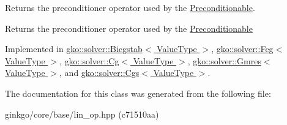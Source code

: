 Returns the preconditioner operator used by the \hyperlink{classgko_1_1Preconditionable}{Preconditionable}. 

\begin{DoxyReturn}{Returns}
the preconditioner operator used by the \hyperlink{classgko_1_1Preconditionable}{Preconditionable} 
\end{DoxyReturn}


Implemented in \hyperlink{classgko_1_1solver_1_1Bicgstab_ac16d32672fbc91d8cfd7c0607c9771db}{gko\+::solver\+::\+Bicgstab$<$ Value\+Type $>$}, \hyperlink{classgko_1_1solver_1_1Fcg_a2dec8d13548e8b316d6598c9ee8b0881}{gko\+::solver\+::\+Fcg$<$ Value\+Type $>$}, \hyperlink{classgko_1_1solver_1_1Cg_a797544ecc8d86d2798014e7f5f5baf4f}{gko\+::solver\+::\+Cg$<$ Value\+Type $>$}, \hyperlink{classgko_1_1solver_1_1Gmres_ac2e3e0024a37647eda9f8a7f5b4cefb4}{gko\+::solver\+::\+Gmres$<$ Value\+Type $>$}, and \hyperlink{classgko_1_1solver_1_1Cgs_ad349dc1381dfdcb7a47223908806dcc7}{gko\+::solver\+::\+Cgs$<$ Value\+Type $>$}.



The documentation for this class was generated from the following file\+:\begin{DoxyCompactItemize}
\item 
ginkgo/core/base/lin\+\_\+op.\+hpp (c71510aa)\end{DoxyCompactItemize}
